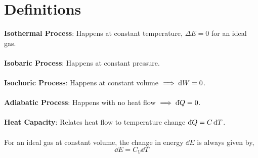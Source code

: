 \documentclass{book}
\newcommand{\dbar}{\mathrm{d}\hspace*{-0.08em}\bar{}\hspace*{0.1em}}
\begin{document}
\appendix
\chapter{Definitions}
\textbf{Isothermal Process}:  Happens at constant temperature, $\Delta E = 0$ for an ideal gas.
\\\\
\textbf{Isobaric Process}: Happens at constant pressure.
\\\\
\textbf{Isochoric Process}: Happens at constant volume $\implies \dbar W = 0$.
\\\\
\textbf{Adiabatic Process}: Happens with no heat flow $\implies \dbar Q = 0$.
\\\\
\textbf{Heat Capacity}: Relates heat flow to temperature change $\dbar Q = C \dd{T}$.
\\\\
For an ideal gas at constant volume, the change in energy $\dd{E}$ is always given by,
\begin{equation}
	\dd{E} = C_V \dd{T}
\end{equation}
\end{document}
